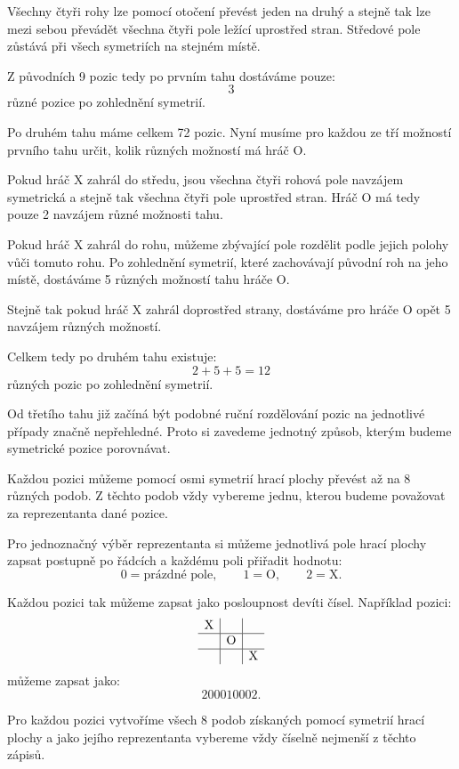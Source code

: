 \documentclass[12pt,a4paper]{article}
\begin{document}
Všechny čtyři rohy lze pomocí otočení převést jeden na druhý a stejně tak lze mezi sebou převádět všechna čtyři pole ležící uprostřed stran. Středové pole zůstává při všech symetriích na stejném místě.

Z původních 9 pozic tedy po prvním tahu dostáváme pouze:
\[
    3
\]
různé pozice po zohlednění symetrií.

Po druhém tahu máme celkem 72 pozic. 
Nyní musíme pro každou ze tří možností prvního tahu určit, 
kolik různých možností má hráč $\mathrm{O}$.

Pokud hráč $\mathrm{X}$ zahrál do středu, 
jsou všechna čtyři rohová pole navzájem symetrická 
a stejně tak všechna čtyři pole uprostřed stran. 
Hráč $\mathrm{O}$ má tedy pouze 2 navzájem různé možnosti tahu.

Pokud hráč $\mathrm{X}$ zahrál do rohu, 
můžeme zbývající pole rozdělit podle jejich polohy vůči tomuto rohu. 
Po zohlednění symetrií, které zachovávají původní roh na jeho místě, 
dostáváme 5 různých možností tahu hráče $\mathrm{O}$.

Stejně tak pokud hráč $\mathrm{X}$ zahrál doprostřed strany, 
dostáváme pro hráče $\mathrm{O}$ opět 5 navzájem různých možností.

Celkem tedy po druhém tahu existuje:
\[
    2+5+5=12
\]
různých pozic po zohlednění symetrií.

Od třetího tahu již začíná být podobné ruční rozdělování pozic 
na jednotlivé případy značně nepřehledné. 
Proto si zavedeme jednotný způsob, kterým budeme symetrické pozice porovnávat.

Každou pozici můžeme pomocí osmi symetrií hrací plochy převést až na 8 různých podob. 
Z těchto podob vždy vybereme jednu, kterou budeme považovat za reprezentanta dané pozice.

Pro jednoznačný výběr reprezentanta si můžeme jednotlivá pole hrací plochy 
zapsat postupně po řádcích a každému poli přiřadit hodnotu:
\[
    0=\text{prázdné pole}, \qquad 1=\mathrm{O}, \qquad 2=\mathrm{X}.
\]

Každou pozici tak můžeme zapsat jako posloupnost devíti čísel. Například pozici:
\[
\begin{array}{c|c|c}
    \mathrm{X} & & \\
    \hline
    & \mathrm{O} & \\
    \hline
    & & \mathrm{X}
\end{array}
\]
můžeme zapsat jako:
\[
    200010002.
\]

Pro každou pozici vytvoříme všech 8 podob získaných pomocí symetrií hrací plochy 
a jako jejího reprezentanta vybereme vždy číselně nejmenší z těchto zápisů.
\end{document}
